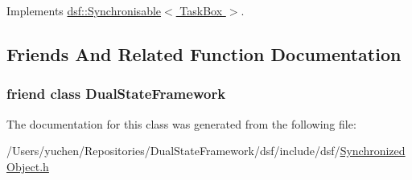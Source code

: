 Implements \hyperlink{classdsf_1_1_synchronisable_a225f9a5f6cb47d73e1ea4d788bbfcaaa}{dsf\+::\+Synchronisable$<$ Task\+Box $>$}.



\subsection{Friends And Related Function Documentation}
\hypertarget{classdsf_1_1_synchronized_object_a86db03c65431cb461cc8abf33bd2e74a}{}
\subsubsection[{Dual\+State\+Framework}]{\setlength{\rightskip}{0pt plus 5cm}friend class {\bf Dual\+State\+Framework}\hspace{0.3cm}{\ttfamily [friend]}}\label{classdsf_1_1_synchronized_object_a86db03c65431cb461cc8abf33bd2e74a}


The documentation for this class was generated from the following file\+:\begin{DoxyCompactItemize}
\item 
/\+Users/yuchen/\+Repositories/\+Dual\+State\+Framework/dsf/include/dsf/\hyperlink{_synchronized_object_8h}{Synchronized\+Object.\+h}\end{DoxyCompactItemize}
